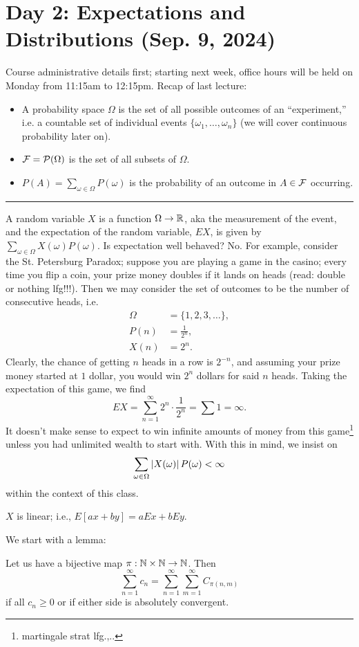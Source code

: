 \section{Day 2: Expectations and Distributions (Sep. 9, 2024)}
Course administrative details first; starting next week, office hours will be held on Monday from 11:15am to 12:15pm. Recap of last lecture:
\begin{itemize}
    \item A probability space $\Omega$ is the set of all possible outcomes of an ``experiment,'' i.e. a countable set of individual events $\{\omega_1, \dots, \omega_n\}$ (we will cover continuous probability later on).
    \item $\mathcal F = \mathcal P(\Omega)$ is the set of all subsets of $\Omega$.
    \item $P(A) = \sum_{\omega \in \Omega} P(\omega)$ is the probability of an outcome in $A \in \mathcal F$ occurring.
\end{itemize}
\hrule \bigskip
\noindent A random variable $X$ is a function $\Omega \to \mathbb R$, aka the measurement of the event, and the expectation of the random variable, $EX$, is given by $\sum_{\omega \in \Omega} X(\omega) P(\omega)$. Is expectation well behaved? No. For example, consider the St. Petersburg Paradox; suppose you are playing a game in the casino; every time you flip a coin, your prize money doubles if it lands on heads (read: double or nothing lfg!!!). Then we may consider the set of outcomes to be the number of consecutive heads, i.e.
\begin{align*}
    \Omega &= \{1, 2, 3, \dots\}, \\
    P(n) &= \frac{1}{2^n}, \\
    X(n) &= 2^n.
\end{align*}
Clearly, the chance of getting $n$ heads in a row is $2^{-n}$, and assuming your prize money started at $1$ dollar, you would win $2^n$ dollars for said $n$ heads. Taking the expectation of this game, we find
\[ EX = \sum_{n=1}^{\infty} 2^n \cdot \frac{1}{2^n} = \sum 1 = \infty. \]
It doesn't make sense to expect to win infinite amounts of money from this game\footnote{martingale strat lfg.,..} unless you had unlimited wealth to start with. With this in mind, we insist on
\[ \sum_{\omega \in \Omega} \left\lvert X(\omega) \right\rvert P(\omega) < \infty \]
within the context of this class.
\begin{simplethm}
    $X$ is linear; i.e., $E[ax + by] = aEx + bEy$.
\end{simplethm}
We start with a lemma:
\begin{simplelemma}
    Let us have a bijective map $\pi : \mathbb N \times \mathbb N \to \mathbb N$. Then
    \[ \sum_{n=1}^\infty c_n = \sum_{n=1}^\infty \sum_{m=1}^\infty C_{\pi(n, m)} \]
    if all $c_n \geq 0$ or if either side is absolutely convergent.
\end{simplelemma}

